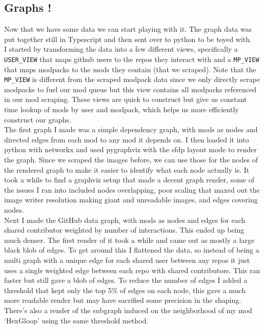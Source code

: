 \documentclass[a4paper,11pt, twocolumn]{article}
\begin{document}
\subsection{Graphs !}

Now that we have some data we can start playing with it. The graph data was put together still in Typescript and then sent over to python to be toyed with.\\

I started by transforming the data into a few different views, specifically a \verb|USER_VIEW| that maps github users to the repos they interact with and a \verb|MP_VIEW| that maps modpacks to the mods they contain (that we scraped). Note that the \verb|MP_VIEW| is different from the scraped modpack data since we only directly scrape modpacks to fuel our mod queue but this view contains all modpacks referenced in our mod scraping. These views are quick to construct but give us constant time lookup of mods by user and modpack, which helps us more efficiently construct our graphs.\\

The first graph I made was a simple dependency graph, with mods as nodes and directed edges from each mod to any mod it depends on. I then loaded it into python with networkx and used pygraphviz with the sfdp layout mode to render the graph. Since we scraped the images before, we can use those for the nodes of the rendered graph to make it easier to identify what each node actually is. It took a while to find a graphviz setup that made a decent graph render, some of the issues I ran into included nodes overlapping, poor scaling that maxed out the image writer resolution making giant and unreadable images, and edges covering nodes.\\

Next I made the GitHub data graph, with mods as nodes and edges for each shared contributor weighted by number of interactions. This ended up being much denser. The first render of it took a while and came out as mostly a large black blob of edges. To get around this I flattened the data, so instead of being a multi graph with a unique edge for each shared user between any repos it just uses a single weighted edge between each repo with shared contributors. This ran faster but still gave a blob of edges. To reduce the number of edges I added a threshold that kept only the top 5\% of edges on each node, this gave a much more readable render but may have sacrified some precision in the shaping. There's also a render of the subgraph induced on the neighborhood of my mod `HexGloop' using the same threshold method.\\
\end{document}
